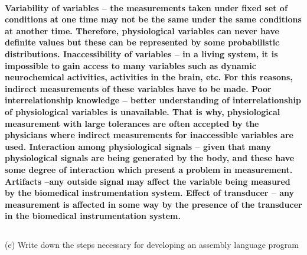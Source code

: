 \documentclass[article]{article}
\begin{document}
\paragraph{Variability of variables – the measurements taken under fixed set of conditions at one time may not be the same under the same conditions at another time. Therefore, physiological variables can never have definite values but these can be represented by some probabilistic distributions.
Inaccessibility of variables – in a living system, it is impossible to gain access to many variables such as dynamic neurochemical activities, activities in the brain, etc. For this reasons, indirect measurements of these variables have to be made.
Poor interrelationship knowledge – better understanding of interrelationship of physiological variables is unavailable. That is why, physiological measurement with large tolerances are often accepted by the physicians where indirect measurements for inaccessible variables are used.
Interaction among physiological signals – given that many physiological signals are being generated by the body, and these have some degree of interaction which present a problem in measurement.
Artifacts –any outside signal may affect the variable being measured by the biomedical instrumentation system.
Effect of transducer – any measurement is affected in some way by the presence of the transducer in the biomedical instrumentation system.
}
\subsection*{}(e) Write down the steps necessary for developing an assembly language program
\end{document}
